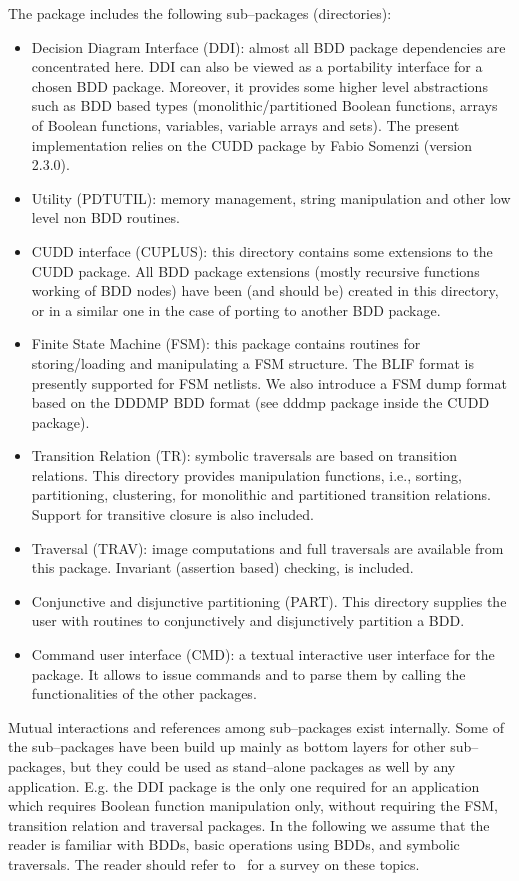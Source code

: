 The package includes the following sub--packages (directories):
\begin{itemize}
\item
Decision Diagram Interface (DDI): almost all BDD package dependencies are
concentrated here.
DDI can also be viewed as a portability interface for a chosen BDD package.
Moreover, it provides some higher level abstractions such as BDD based
types (monolithic/partitioned Boolean functions, arrays of Boolean functions,
variables, variable arrays and sets).
The present implementation relies on the CUDD package by Fabio Somenzi
(version 2.3.0).
\item
Utility (PDTUTIL): memory management, string manipulation and
other low level non BDD routines. 
\item
CUDD interface (CUPLUS): this directory contains some 
extensions to the CUDD package.
All BDD package extensions (mostly recursive functions working of BDD nodes)
have been (and should be) created in this directory, or in a similar one in
the case of porting to another BDD package. 
\item
Finite State Machine (FSM): this package contains routines for storing/loading
and manipulating a FSM structure.
The BLIF format is presently supported for FSM netlists. We also
introduce a FSM dump format based on the DDDMP BDD format 
(see dddmp package inside the CUDD package).
\item
Transition Relation (TR): symbolic traversals are based on transition
relations.
This directory provides manipulation functions, i.e., sorting, partitioning,
clustering, for monolithic and partitioned transition relations.
Support for transitive closure is also included.
\item
Traversal (TRAV): image computations and full traversals are available from
this package. Invariant (assertion based) checking, is included.
\item
Conjunctive and disjunctive partitioning (PART).
This directory supplies the user with routines to conjunctively and
disjunctively partition a BDD.
\item 
Command user interface (CMD): a textual interactive user interface for the
package.
It allows to issue commands and to parse them by calling the functionalities
of the other packages.
\end{itemize}

Mutual interactions and references among sub--packages exist internally.
Some of the sub--packages have been build up mainly as bottom layers for other sub--packages,
but they could be used as stand--alone packages as well by any application.
E.g. the DDI package is the only one required for an application which
requires Boolean function manipulation only, without requiring the
FSM, transition relation and traversal packages.
In the following we assume that the reader is familiar with BDDs, basic
operations using BDDs, and symbolic traversals.
The reader should refer to~\cite{Bryant86,Bryant92} for a survey on these
topics.

